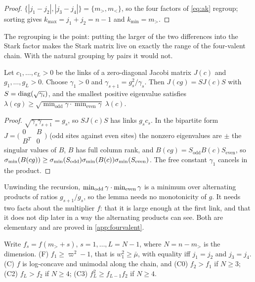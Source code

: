 \begin{proof}
$\{|j_1-j_2|,|j_3-j_4|\}=\{m_>,m_<\}$, so the four factors of \eqref{eq:ak} regroup;
sorting gives $k_{\max}=j_1+j_2=n-1$ and $k_{\min}=m_>$.
\end{proof}

The regrouping is the point: putting the larger of the two differences into the
Stark factor makes the Stark matrix live on exactly the range of the four-valent
chain. With the natural grouping by pairs it would not.

\begin{lemma}\label{lem:sitescale}
Let $c_1,\dots,c_L>0$ be the links of a zero-diagonal Jacobi matrix $J(c)$ and
$g_1,\dots,g_L>0$. Choose $\gamma_1>0$ and $\gamma_{s+1}=g_s^2/\gamma_s$. Then $J(cg)=SJ(c)S$ with
$S=\operatorname{diag}(\sqrt{\gamma_i})$, and the smallest positive eigenvalue satisfies
$\lambda(cg)\ge\sqrt{\min_{\mathrm{odd}}\gamma\cdot\min_{\mathrm{even}}\gamma}\;\lambda(c)$.
\end{lemma}

\begin{proof}
$\sqrt{\gamma_s\gamma_{s+1}}=g_s$, so $SJ(c)S$ has links $g_sc_s$. In the bipartite form
$J=\bigl(\begin{smallmatrix}0&B\\B^T&0\end{smallmatrix}\bigr)$ (odd sites against
even sites) the nonzero eigenvalues are $\pm$ the singular values of $B$, $B$ has full
column rank, and $B(cg)=S_{\mathrm{odd}}B(c)S_{\mathrm{even}}$, so
$\sigma_{\min}(B(cg))\ge\sigma_{\min}(S_{\mathrm{odd}})\sigma_{\min}(B(c))\sigma_{\min}(S_{\mathrm{even}})$. The free
constant $\gamma_1$ cancels in the product.
\end{proof}

Unwinding the recursion, $\min_{\rm odd}\gamma\cdot\min_{\rm even}\gamma$ is a minimum over
alternating products of ratios $g_{s+1}/g_s$, so the lemma needs no monotonicity of
$g$. It needs two facts about the multiplier $f$: that it is large enough at the
first link, and that it does not dip later in a way the alternating products can
see. Both are elementary and are proved in \cref{app:fourvalent}.

\begin{lemma}\label{lem:multiplier}
Write $f_s=f(m_>+s)$, $s=1,\dots,L=N-1$, where $N=n-m_>$ is the dimension.
\textup{(F)} $f_1\ge \varpi^2-1$, that is $w_1^2\ge\bar\mu$, with equality iff $j_1=j_2$ and
$j_3=j_4$.
\textup{(C)} $f$ is log-concave and unimodal along the chain, and
\textup{(C0)} $f_2>f_1$ if $N\ge3$; \textup{(C2)} $f_L>f_2$ if $N\ge4$;
\textup{(C3)} $f_L^2\ge f_{L-1}f_2$ if $N\ge4$.
\end{lemma}

